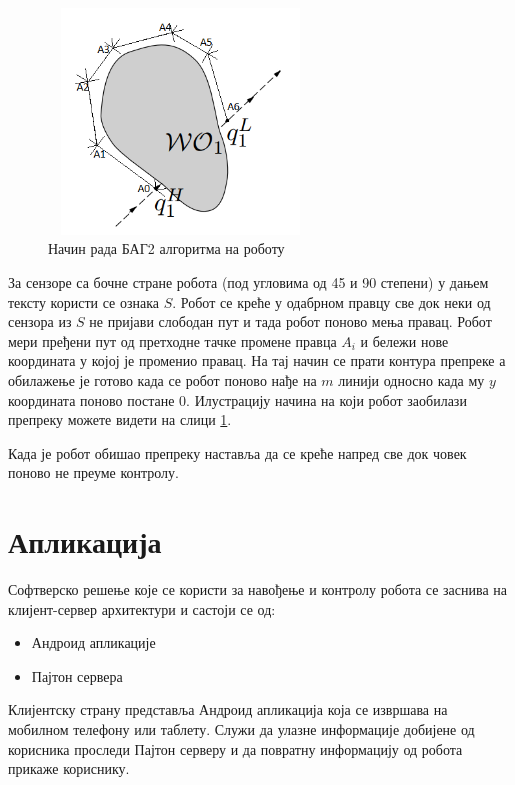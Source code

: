 \documentclass[12pt,oneside]{memoir}
\theoremstyle{remark}
\begin{document}
\begin{figure}[!ht]
\centering
\includegraphics[width=7cm, height=6cm]{slike/adapt_bug.png}
\caption{Начин рада БАГ2 алгоритма на роботу}
\label{fig:bugadapt}
\end{figure}

За сензоре са бочне стране робота (под угловима од 45 и 90 степени) у дањем тексту користи се ознака $S$. Робот се креће у одабрном правцу све док неки од сензора из $S$ не пријави слободан пут и тада робот поново мења правац. Робот мери пређени пут од претходне тачке промене правца $A_{i}$ и бележи нове координата у којој је променио правац. На тај начин се прати контура препреке а обилажење је готово када се робот поново нађе на $m$ линији односно када му $y$ координата поново постане 0. Илустрацију начина на који робот заобилази препреку можете видети на слици  \ref{fig:bugadapt}.

Када је робот обишао препреку наставља да се креће напред све док човек поново не преуме контролу.


\chapter{Апликација}
\label{chp:aplikacija}
Софтверско решење које се користи за навођење и контролу робота се заснива на клијент-сервер архитектури и састоји се од:
\begin{itemize}
\item Андроид апликације
\item Пајтон сервера
\end{itemize}

Клијентску страну представља Андроид апликација која се извршава на мобилном телефону или таблету. Служи да улазне информације добијене од корисника проследи Пајтон серверу и да повратну информацију од робота прикаже кориснику.
\end{document}
